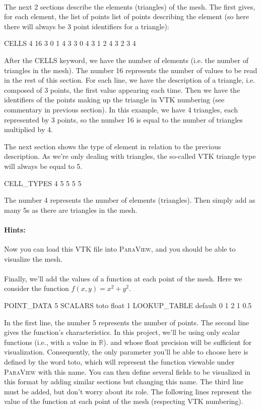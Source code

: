 \documentclass[11pt,a4paper]{article}
\begin{document}
\paragraph{}
The next 2 sections describe the elements (triangles) of the mesh. The first gives, for each element, the list of points
list of points describing the element (so here there will always be 3 point identifiers for a triangle):
\begin{mycpplistingInTabular}{}
CELLS 4 16
3 0 1 4
3 3 0 4
3 1 2 4
3 2 3 4
\end{mycpplistingInTabular}
After the CELLS keyword, we have the number of elements (i.e. the number of triangles in the mesh). The number 16 represents the number of values to be read in the rest of this section.
For each line, we have the description of a triangle, i.e. composed of 3 points, the first value appearing each time. Then we have the identifiers of the points making up the triangle
in VTK numbering (see commentary in previous section).
In this example, we have 4 triangles, each represented by 3 points, so the number 16 is equal to the number of triangles multiplied by 4.

The next section shows the type of element in relation to the previous description. As we're only dealing with triangles, the so-called VTK triangle type will always be equal to 5.
\begin{mycpplistingInTabular}{}
CELL_TYPES 4
5
5
5
5
\end{mycpplistingInTabular}
The number 4 represents the number of elements (triangles). Then simply add as many 5s as there are triangles in the mesh.


\paragraph{Hints:}
Now you can load this VTK file into \textsc{ParaView}, and you should be able to visualize the mesh.

\paragraph{}
Finally, we'll add the values of a function at each point of the mesh. Here we consider the function $f(x,y)=x^2+y^2$.
\begin{mycpplistingInTabular}{}
POINT_DATA 5
SCALARS toto float 1
LOOKUP_TABLE default
0
1
2
1
0.5
\end{mycpplistingInTabular}
In the first line, the number 5 represents the number of points.
The second line gives the function's characteristics. In this project, we'll be using only scalar functions (i.e., with a value in $\mathbb{R}$).
and whose float precision will be sufficient for visualization.
Consequently, the only parameter you'll be able to choose here is defined by the word toto, which will represent the function viewable under \textsc{ParaView} with this name.
You can then define several fields to be visualized in this format by adding similar sections but changing this name.
The third line must be added, but don't worry about its role.
The following lines represent the value of the function at each point of the mesh (respecting VTK numbering).
\end{document}
